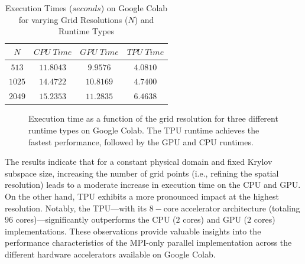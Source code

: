 \documentclass[12pt,a4paper]{report}
\begin{document}
\begin{table}[h]
    \centering
    \caption{Execution Times ($seconds$) on Google Colab for varying Grid Resolutions ($N$) and Runtime Types}
    \label{tab:colab_times}
    \begin{tabular}{cccc}
    \hline
    $N$ & $CPU \; Time$ & $GPU \; Time$ & $TPU \; Time$ \\ \hline
    $513$   & $11.8043$    & $9.9576$     & $4.0810$    \\
    $1025$  & $14.4722$    & $10.8169$    & $4.7400$    \\
    $2049$  & $15.2353$    & $11.2835$    & $6.4638$    \\ \hline
    \end{tabular}
\end{table}

\begin{figure}[htbp]
\centering
{}
\caption{Execution time as a function of the grid resolution for three different runtime types on Google Colab. The TPU runtime achieves the fastest performance, followed by the GPU and CPU runtimes.}
\label{fig:execution_time_colab}
\end{figure}

The results indicate that for a constant physical domain and fixed Krylov subspace size, increasing the number of grid points (i.e., refining the spatial resolution) leads to a moderate increase in execution time on the CPU and GPU. On the other hand, TPU exhibits a more pronounced impact at the highest resolution. Notably, the TPU—with its $8-$core accelerator architecture (totaling $96$ cores)—significantly outperforms the CPU ($2$ cores) and GPU ($2$ cores) implementations. These observations provide valuable insights into the performance characteristics of the MPI-only parallel implementation across the different hardware accelerators available on Google Colab.
\end{document}
